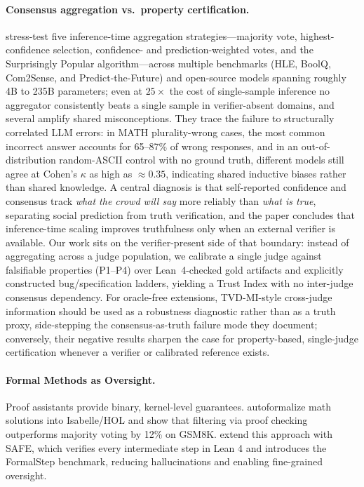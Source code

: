 \documentclass{article}
\begin{document}
\paragraph{Consensus aggregation vs.\ property certification.}
\citet{denisovblanch2026consensus} stress-test five inference-time aggregation strategies---majority vote, highest-confidence selection, confidence- and prediction-weighted votes, and the Surprisingly Popular algorithm---across multiple benchmarks (HLE, BoolQ, Com2Sense, and Predict-the-Future) and open-source models spanning roughly 4B to 235B parameters; even at $25\times$ the cost of single-sample inference no aggregator consistently beats a single sample in verifier-absent domains, and several amplify shared misconceptions.
They trace the failure to structurally correlated LLM errors: in MATH plurality-wrong cases, the most common incorrect answer accounts for 65--87\% of wrong responses, and in an out-of-distribution random-ASCII control with no ground truth, different models still agree at Cohen's $\kappa$ as high as ${\approx}0.35$, indicating shared inductive biases rather than shared knowledge.
A central diagnosis is that self-reported confidence and consensus track \emph{what the crowd will say} more reliably than \emph{what is true}, separating social prediction from truth verification, and the paper concludes that inference-time scaling improves truthfulness only when an external verifier is available.
Our work sits on the verifier-present side of that boundary: instead of aggregating across a judge population, we calibrate a single judge against falsifiable properties (P1--P4) over Lean~4-checked gold artifacts and explicitly constructed bug/specification ladders, yielding a Trust Index with no inter-judge consensus dependency.
For oracle-free extensions, TVD-MI-style cross-judge information should be used as a robustness diagnostic rather than as a truth proxy, side-stepping the consensus-as-truth failure mode they document; conversely, their negative results sharpen the case for property-based, single-judge certification whenever a verifier or calibrated reference exists.

\paragraph{Formal Methods as Oversight.}
Proof assistants provide binary, kernel-level guarantees. \citet{zhou2024donttrustverify} autoformalize math solutions into Isabelle/HOL and show that filtering via proof checking outperforms majority voting by 12\% on GSM8K. \citet{liu2025safe} extend this approach with SAFE, which verifies every intermediate step in Lean 4 and introduces the FormalStep benchmark, reducing hallucinations and enabling fine-grained oversight.
\end{document}
